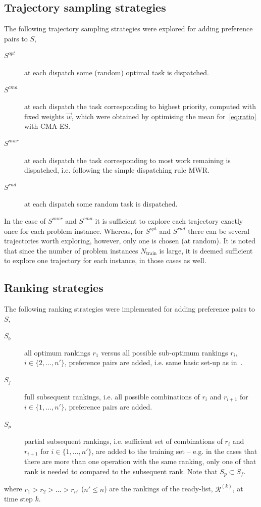 \documentclass{svjour3}                     %
\begin{document}
\subsection{Trajectory sampling strategies}
The following trajectory sampling strategies were explored for adding preference pairs to $S$,
\begin{description}
\item[$S^{opt}$] at each dispatch some (random) optimal task is dispatched.
\item[$S^{cma}$] at each dispatch the task corresponding to highest priority, computed with fixed weights $\vec{w}$, which were obtained by optimising the mean for~\eqref{eq:ratio} with CMA-ES. 
\item[$S^{mwr}$] at each dispatch the task corresponding to most work remaining is dispatched, i.e. following the simple dispatching rule MWR.
\item[$S^{rnd}$] at each dispatch some random task is dispatched.
\end{description}
In the case of $S^{mwr}$ and $S^{cma}$ it is sufficient to explore each trajectory exactly once for each problem instance. Whereas, for $S^{opt}$ and $S^{rnd}$ there can be several trajectories worth exploring, however, only one is chosen (at random). 
It is noted that since the number of problem instances $N_{\text{train}}$ is large, it is deemed sufficient to explore one trajectory for each instance, in those cases as well.

\subsection{Ranking strategies}
The following ranking strategies were implemented for adding preference pairs to $S$,
\begin{description}
\item[$S_b$] all optimum rankings $r_1$ versus all possible sub-optimum rankings $r_i$, $i\in\{2,\ldots,n'\}$, preference pairs are added, i.e. same basic set-up as in~\cite{InRu11a}. %
\item[$S_f$] full subsequent rankings, i.e. all possible combinations of $r_i$ and $r_{i+1}$ for $i\in\{1,\ldots,n'\}$, preference pairs are added.
\item[$S_p$] partial subsequent rankings, i.e. sufficient set of combinations of $r_i$ and $r_{i+1}$ for $i\in\{1,\ldots,n'\}$, are added to the training set -- e.g. in the cases that there are more than one operation with the same ranking, only one of that rank is needed to compared to the subsequent rank. Note that $S_p\subset S_f$.
\end{description}
where $r_1>r_2>\ldots>r_{n'}$ ($n'\leq n$) are the rankings of the ready-list, $\mathcal{R}^{(k)}$, at time step $k$.
\end{document}
